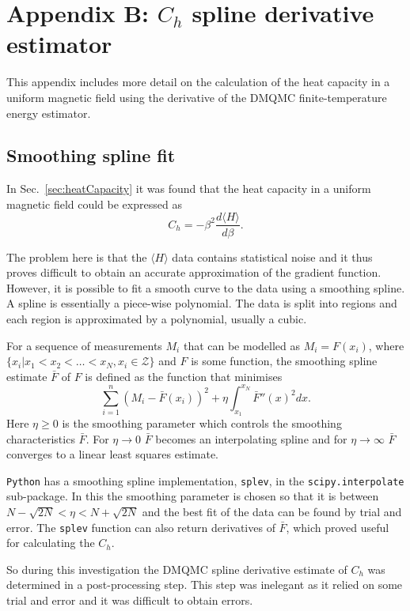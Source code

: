 \chapter{Appendix B: $C_h$ spline derivative estimator}
This appendix includes more detail on the calculation of the heat capacity in a uniform magnetic field using the derivative of the DMQMC finite-temperature energy estimator.

\section*{Smoothing spline fit}
In Sec.~\ref{sec:heatCapacity} it was found that the heat capacity in a uniform magnetic field could be expressed as
\begin{equation}
C_{h} = -\beta^2\frac{d\langle H\rangle}{d\beta}.
\end{equation}

The problem here is that the $\langle H\rangle$ data contains statistical noise and it thus proves difficult to obtain an accurate approximation of the gradient function. However, it is possible to fit a smooth curve to the data using a smoothing spline\cite{Reinsch}. A spline is essentially a piece-wise polynomial. The data is split into regions and each region is approximated by a polynomial, usually a cubic.

For a sequence of measurements $M_i$ that can be modelled as $M_i =F(x_i)$, where $\{ x_i \lvert x_1 < x_2 < \dots < x_N, x_i \in \mathcal{Z} \}$ and $F$ is some function, the smoothing spline estimate $\bar{F}$ of $F$ is defined as the function that minimises 
\begin{equation}
\sum^n_{i=1} (M_i - \bar{F}(x_i))^2 + \eta \int_{x_1}^{x_N} \bar{F}''(x)^2 dx.
\end{equation}
Here $\eta \geq 0$ is the smoothing parameter which controls the smoothing characteristics $\bar{F}$. For $\eta \to 0$ $\bar{F}$ becomes an interpolating spline and for $\eta \to \infty$ $\bar{F}$ converges to a linear least squares estimate. 

\texttt{Python} has a smoothing spline implementation, \texttt{splev}, in the \texttt{scipy.interpolate} sub-package. In this the smoothing parameter is chosen so that it is between $N-\sqrt{2N} < \eta < N+\sqrt{2N}$ and the best fit of the data can be found by trial and error. The \texttt{splev} function can also return derivatives of $\bar{F}$, which proved useful for calculating the $C_h$.

So during this investigation the DMQMC spline derivative estimate of $C_h$ was determined in a post-processing step. This step was inelegant as it relied on some trial and error and it was difficult to obtain errors.





